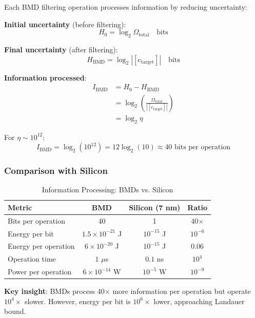 \documentclass[11pt,a4paper]{article}
\begin{document}
Each BMD filtering operation processes information by reducing uncertainty:

\textbf{Initial uncertainty} (before filtering):
\begin{equation}
H_0 = \log_2 \Omega_{\text{total}} \quad \text{bits}
\end{equation}

\textbf{Final uncertainty} (after filtering):
\begin{equation}
H_{\text{BMD}} = \log_2 |[c_{\text{target}}]| \quad \text{bits}
\end{equation}

\textbf{Information processed}:
\begin{align}
I_{\text{BMD}} &= H_0 - H_{\text{BMD}} \\
&= \log_2 \left(\frac{\Omega_{\text{total}}}{|[c_{\text{target}}]|}\right) \\
&= \log_2 \eta
\end{align}

For $\eta \sim 10^{12}$:
\begin{equation}
I_{\text{BMD}} = \log_2(10^{12}) = 12 \log_2(10) \approx 40 \text{ bits per operation}
\end{equation}

\subsubsection{Comparison with Silicon}

\begin{table}[H]
\centering
\caption{Information Processing: BMDs vs. Silicon}
\begin{tabular}{lccc}
\toprule
\textbf{Metric} & \textbf{BMD} & \textbf{Silicon (7 nm)} & \textbf{Ratio} \\
\midrule
Bits per operation & 40 & 1 & 40$\times$ \\
Energy per bit & $1.5 \times 10^{-21}$ J & $10^{-15}$ J & $10^{-6}$ \\
Energy per operation & $6 \times 10^{-20}$ J & $10^{-15}$ J & $0.06$ \\
Operation time & $1$ $\mu$s & $0.1$ ns & $10^4$ \\
Power per operation & $6 \times 10^{-14}$ W & $10^{-5}$ W & $10^{-9}$ \\
\bottomrule
\end{tabular}
\end{table}

\textbf{Key insight}: BMDs process 40$\times$ more information per operation but operate $10^4\times$ slower. However, energy per bit is $10^6\times$ lower, approaching Landauer bound.
\end{document}
